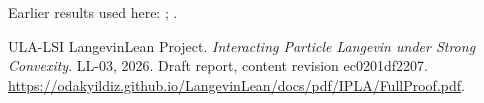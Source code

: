 \documentclass[11pt,a4paper]{article}
\begin{document}
Earlier results used here: \cite[Section~3.1.1]{LangevinLean2026IPLA}; \cite[Section~3.1.4]{LangevinLean2026IPLA}.

\begin{thebibliography}{ULA-LSI}
LangevinLean Project. \emph{Interacting Particle Langevin under Strong Convexity}. LL-03, 2026. Draft report, content revision ec0201df2207. \url{https://odakyildiz.github.io/LangevinLean/docs/pdf/IPLA/FullProof.pdf}.
\end{thebibliography}
\end{document}
